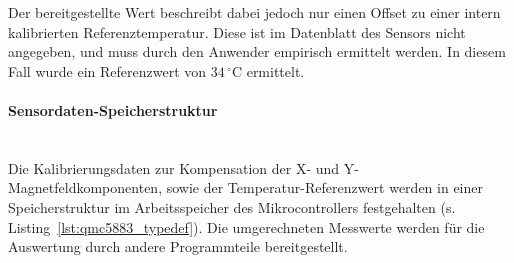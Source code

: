             Der bereitgestellte Wert beschreibt dabei jedoch nur einen Offset zu einer intern kalibrierten Referenztemperatur. Diese ist im Datenblatt des Sensors nicht angegeben, und muss durch den Anwender empirisch ermittelt werden. In diesem Fall wurde ein Referenzwert von $34\,^\circ\mathrm{C}$ ermittelt.
            
            \paragraph{Sensordaten-Speicherstruktur}\mbox{}\\
            Die Kalibrierungsdaten zur Kompensation der X- und Y-Magnetfeldkomponenten, sowie der Temperatur-Referenzwert werden in einer Speicherstruktur im Arbeitsspeicher des Mikrocontrollers festgehalten (s. Listing~\ref{lst:qmc5883_typedef}). Die umgerechneten Messwerte werden für die Auswertung durch andere Programmteile bereitgestellt.
            
